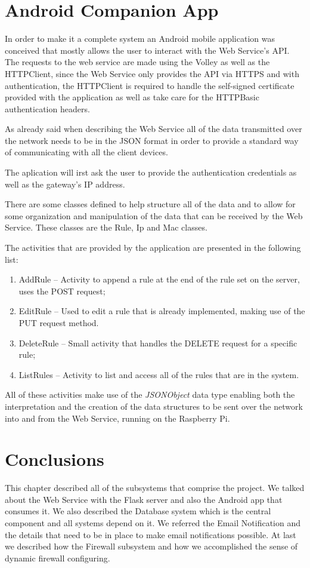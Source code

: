 \section{Android Companion App}
\label{chap4:sec:android}
In order to make it a complete system an Android mobile application was
conceived that mostly allows the user to interact with the Web Service's API.
The requests to the web service are made using the Volley as well as the
HTTPClient, since the Web Service only provides the API via HTTPS and with
authentication, the HTTPClient is required to handle the self-signed certificate
provided with the application as well as take care for the HTTPBasic
authentication headers.

As already said when describing the Web Service all of the data transmitted over
the network needs to be in the JSON format in order to provide a standard way of
communicating with all the client devices.

The aplication will irst ask the user to provide the authentication credentials
as well as the gateway's IP address.


There are some classes defined to help structure all of the data and to allow
for some organization and manipulation of the data that can be received by the
Web Service. These classes are the Rule, Ip and Mac classes.

The activities that are provided by the application are presented in the
following list:
\begin{enumerate}
	\item AddRule -- Activity to append a rule at the end of the rule set on the
		server, uses the POST request;
	\item EditRule -- Used to edit a rule that is already implemented, making
		use of the PUT request method.
	\item DeleteRule -- Small activity that handles the DELETE request for a
		specific rule;
	\item ListRules -- Activity to list and access all of the rules that are in
		the system.
\end{enumerate}

All of these activities make use of the \emph{JSONObject} data type enabling
both the interpretation and the creation of the data structures to be sent over
the network into and from the Web Service, running on the Raspberry Pi.

\section{Conclusions}
\label{chap4:sec:concs}
This chapter described all of the subsystems that comprise the project. We
talked about the Web Service with the Flask server and also the Android app that
consumes it. We also described the Database system which is the central
component and all systems depend on it. We referred the Email Notification and
the details that need to be in place to make email notifications possible. At
last we described how the Firewall subsystem and how we accomplished the sense
of dynamic firewall configuring.
